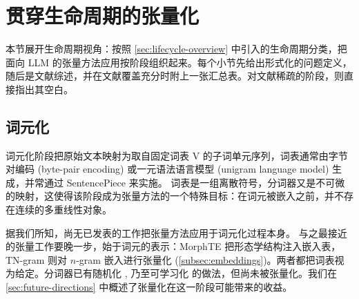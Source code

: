 \documentclass[11pt]{article}
\newcommand{\R}{\mathbb{R}}
\newcommand{\set}[1]{\mathrm{#1}}
\begin{document}
\section{贯穿生命周期的张量化}
\label{sec:lifecycle-analysis}

本节展开生命周期视角：按照 \cref{sec:lifecycle-overview} 中引入的生命周期分类，把面向 LLM 的张量方法应用按阶段组织起来。每个小节先给出形式化的问题定义，随后是文献综述，并在文献覆盖充分时附上一张汇总表。对文献稀疏的阶段，则直接指出其空白。

\subsection{词元化}
\label{subsec:tokenization}

词元化阶段把原始文本映射为取自固定词表 $\set{V}$ 的子词单元序列，词表通常由字节对编码 (byte-pair encoding) \cite{sennrich2016bpe} 或一元语法语言模型 (unigram language model) \cite{kudo2018unigramlm} 生成，并常通过 SentencePiece \cite{kudo2018sentencepiece} 来实施。
词表是一组离散符号，分词器又是不可微的映射，这使得该阶段成为张量方法的一个特殊目标：在词元被嵌入之前，并不存在连续的多重线性对象。

据我们所知，尚无已发表的工作把张量方法应用于词元化过程本身。
与之最接近的张量工作要晚一步，始于词元的表示：MorphTE \cite{gan2022morphte} 把形态学结构注入嵌入表，TN-gram \cite{zhou2026tensorizingengram} 则对 $n$-gram 嵌入进行张量化 (\cref{subsec:embeddings})。两者都把词表视为给定。分词器已有随机化 \cite{kudo2018unigramlm}, \cite{provilkov2020bpedropout} 乃至可学习化 \cite{tay2022charformer} 的做法，但尚未被张量化。我们在 \cref{sec:future-directions} 中概述了张量化在这一阶段可能带来的收益。



\end{document}
